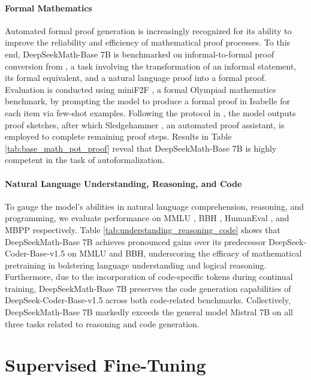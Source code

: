 \paragraph{Formal Mathematics}

Automated formal proof generation is increasingly recognized for its ability to improve the reliability and efficiency of mathematical proof processes. To this end, DeepSeekMath-Base 7B is benchmarked on informal-to-formal proof conversion from \citep{dsp_proof}, a task involving the transformation of an informal statement, its formal equivalent, and a natural language proof into a formal proof. Evaluation is conducted using miniF2F \citep{minif2f}, a formal Olympiad mathematics benchmark, by prompting the model to produce a formal proof in Isabelle for each item via few-shot examples. Following the protocol in \cite{dsp_proof}, the model outputs proof sketches, after which Sledgehammer \citep{sledgehammer}, an automated proof assistant, is employed to complete remaining proof steps. Results in Table \ref{tab:base_math_pot_proof} reveal that DeepSeekMath-Base 7B is highly competent in the task of autoformalization.

\paragraph{Natural Language Understanding, Reasoning, and Code}

To gauge the model's abilities in natural language comprehension, reasoning, and programming, we evaluate performance on MMLU \citep{mmlu}, BBH \citep{bbh}, HumanEval \citep{codex}, and MBPP \citep{mbpp} respectively. Table \ref{tab:understanding_reasoning_code} shows that DeepSeekMath-Base 7B achieves pronounced gains over its predecessor DeepSeek-Coder-Base-v1.5 \citep{deepseek-coder} on MMLU and BBH, underscoring the efficacy of mathematical pretraining in bolstering language understanding and logical reasoning. Furthermore, due to the incorporation of code-specific tokens during continual training, DeepSeekMath-Base 7B preserves the code generation capabilities of DeepSeek-Coder-Base-v1.5 across both code-related benchmarks. Collectively, DeepSeekMath-Base 7B markedly exceeds the general model Mistral 7B \citep{mistral} on all three tasks related to reasoning and code generation.

\section{Supervised Fine-Tuning}

